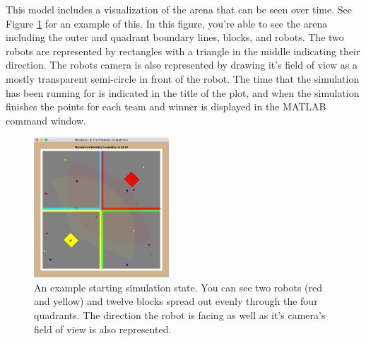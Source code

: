 \documentclass[12pt]{article}
\begin{document}
This model includes a visualization of the arena that can be seen over time. See Figure \ref{fig:arena-1} for an example of this. In this figure, you're able to see the arena including the outer and quadrant boundary lines, blocks, and robots. The two robots are represented by rectangles with a triangle in the middle indicating their direction. The robots camera is also represented by drawing it's field of view as a mostly transparent semi-circle in front of the robot. The time that the simulation has been running for is indicated in the title of the plot, and when the simulation finishes the points for each team and winner is displayed in the MATLAB command window.

\begin{figure}[hbt]
  \center
  \includegraphics[width=0.45\textwidth]{images/arena-1.png}
  \caption{An example starting simulation state. You can see two robots (red and yellow) and twelve blocks spread out evenly through the four quadrants. The direction the robot is facing as well as it's camera's field of view is also represented.}
  \label{fig:arena-1}
\end{figure}
\end{document}
